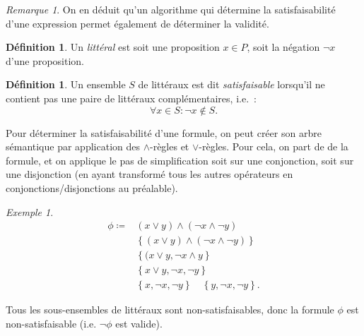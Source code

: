 \documentclass{article}
\theoremstyle{definition}
\newtheorem{déf}[thm]{Définition}
\theoremstyle{remark}
\newtheorem*{rmq}{Remarque}
\newtheorem{ex}{Exemple}[section]
\begin{document}
	\begin{rmq} On en déduit qu'un algorithme qui détermine la satisfaisabilité d'une expression permet également de déterminer la validité.
	\end{rmq}

	\begin{déf} Un \textit{littéral} est soit une proposition $x \in P$, soit la négation $\lnot x$ d'une proposition.
	\end{déf}

	\begin{déf} Un ensemble $S$ de littéraux est dit \textit{satisfaisable} lorsqu'il ne contient pas une paire de littéraux complémentaires, i.e.~:
	\[\forall x \in S : \lnot x \not \in S.\]
	\end{déf}

	Pour déterminer la satisfaisabilité d'une formule, on peut créer son arbre sémantique par application des $\land$-règles et $\lor$-règles. Pour cela,
	on part de de la formule, et on applique le pas de simplification soit sur une conjonction, soit sur une disjonction (en ayant transformé tous les
	autres opérateurs en conjonctions/disjonctions au préalable).

	\begin{ex}
	\begin{align*}
		\phi \coloneqq &(x \lor y) \land (\lnot x \land \lnot y) \\
		&\left\{(x \lor y) \land (\lnot x \land \lnot y)\right\} \\
		&\left\{(x \lor y, \lnot x \land y\right\} \\
		&\left\{x \lor y, \lnot x, \lnot y\right\} \\
		&\left\{x, \lnot x, \lnot y\right\} \quad  \left\{y, \lnot x, \lnot y\right\}.
	\end{align*}

	Tous les sous-ensembles de littéraux sont non-satisfaisables, donc la formule $\phi$ est non-satisfaisable (i.e. $\lnot \phi$ est valide).
	\end{ex}
\end{document}
